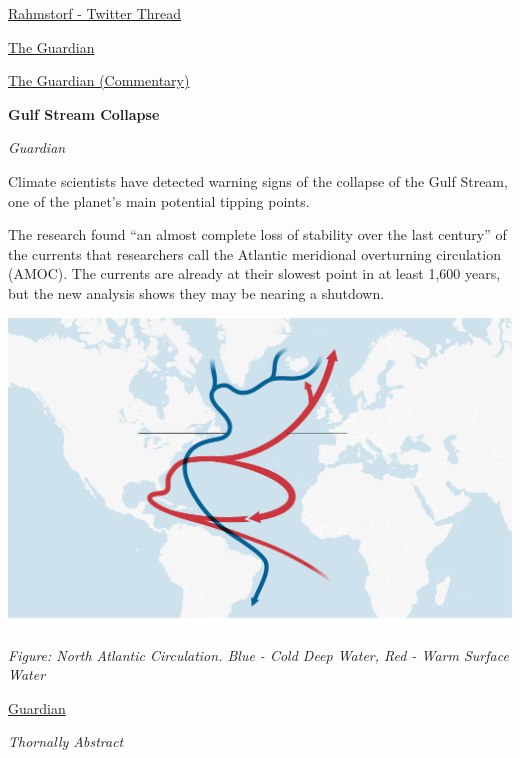 \documentclass[
]{book}
\begin{document}
\href{https://twitter.com/rahmstorf/status/1364976597250568194}{Rahmstorf - Twitter Thread}

\href{https://www.theguardian.com/environment/2021/feb/25/atlantic-ocean-circulation-at-weakest-in-a-millennium-say-scientists}{The Guardian}

\href{https://www.theguardian.com/commentisfree/2021/feb/26/atlantic-currents-climate-oceans-next-century}{The Guardian (Commentary)}

\textbf{Gulf Stream Collapse}

\emph{Guardian}

Climate scientists have detected warning signs of the collapse of the Gulf Stream, one of the planet's main potential tipping points.

The research found ``an almost complete loss of stability over the last century'' of the currents that researchers call the Atlantic meridional overturning circulation (AMOC). The currents are already at their slowest point in at least 1,600 years, but the new analysis shows they may be nearing a shutdown.

\includegraphics{fig/north_atlantic_circulation.png}

\emph{Figure: North Atlantic Circulation. Blue - Cold Deep Water, Red - Warm Surface Water}

\href{https://www.theguardian.com/environment/2021/aug/05/climate-crisis-scientists-spot-warning-signs-of-gulf-stream-collapse}{Guardian}

\emph{Thornally Abstract}
\end{document}
